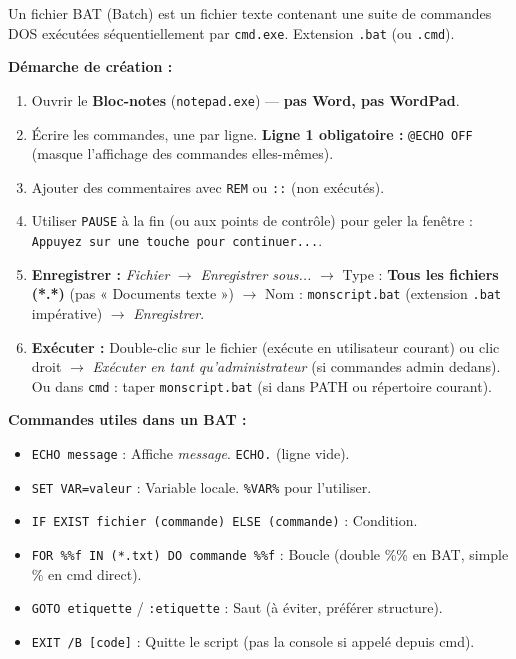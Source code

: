 \documentclass[11pt]{article}
\newcommand{\cle}[1]{{\popxbold\color{popdark}#1}}
\begin{document}
\begin{methode}
Un \cle{fichier BAT} (Batch) est un fichier texte contenant une suite de commandes DOS exécutées séquentiellement par \texttt{cmd.exe}. Extension \texttt{.bat} (ou \texttt{.cmd}).

\textbf{Démarche de création :}
\begin{enumerate}
  \item Ouvrir le \textbf{Bloc-notes} (\texttt{notepad.exe}) — \textbf{pas Word, pas WordPad}.
  \item Écrire les commandes, une par ligne. \textbf{Ligne 1 obligatoire :} \texttt{@ECHO OFF} (masque l'affichage des commandes elles-mêmes).
  \item Ajouter des commentaires avec \texttt{REM} ou \texttt{::} (non exécutés).
  \item Utiliser \texttt{PAUSE} à la fin (ou aux points de contrôle) pour geler la fenêtre : \texttt{Appuyez sur une touche pour continuer...}.
  \item \textbf{Enregistrer :} \emph{Fichier} $\rightarrow$ \emph{Enregistrer sous...} $\rightarrow$ Type : \textbf{Tous les fichiers (*.*)} (pas « Documents texte ») $\rightarrow$ Nom : \texttt{monscript.bat} (extension \texttt{.bat} impérative) $\rightarrow$ \emph{Enregistrer}.
  \item \textbf{Exécuter :} Double-clic sur le fichier (exécute en utilisateur courant) ou clic droit $\rightarrow$ \emph{Exécuter en tant qu'administrateur} (si commandes admin dedans). Ou dans \texttt{cmd} : taper \texttt{monscript.bat} (si dans PATH ou répertoire courant).
\end{enumerate}

\textbf{Commandes utiles dans un BAT :}
\begin{itemize}
  \item \texttt{ECHO message} : Affiche \emph{message}. \texttt{ECHO.} (ligne vide).
  \item \texttt{SET VAR=valeur} : Variable locale. \texttt{\%VAR\%} pour l'utiliser.
  \item \texttt{IF EXIST fichier (commande) ELSE (commande)} : Condition.
  \item \texttt{FOR \%\%f IN (*.txt) DO commande \%\%f} : Boucle (double \%\% en BAT, simple \% en cmd direct).
  \item \texttt{GOTO etiquette} / \texttt{:etiquette} : Saut (à éviter, préférer structure).
  \item \texttt{EXIT /B [code]} : Quitte le script (pas la console si appelé depuis cmd).
\end{itemize}


\end{methode}
\end{document}
